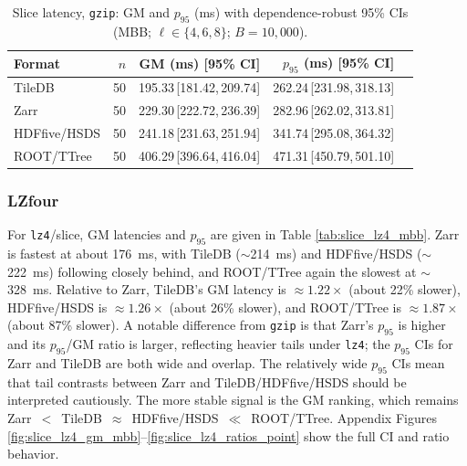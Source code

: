 \documentclass[nomenclature, english, bibtex]{kththesis}
\numberwithin{listing}{chapter}
\begin{document}
\begin{table}[H]
  \centering
  \caption{Slice latency, \texttt{gzip}: \gls{GM} and $p_{95}$ (ms) with dependence-robust 95\% CIs (\gls{MBB}; $\ell\in\{4,6,8\}$; $B{=}10{,}000$).}
  \label{tab:slice_gzip_mbb}
  \begin{tabular}{lrrrr}
    \toprule
    Format & $n$ & \gls{GM} (ms) [95\% \gls{CI}] & $p_{95}$ (ms) [95\% \gls{CI}] \\
    \midrule
    TileDB & 50 & 195.33\,[181.42,\,209.74] & 262.24\,[231.98,\,318.13] \\
    Zarr   & 50 & 229.30\,[222.72,\,236.39] & 282.96\,[262.02,\,313.81] \\
    \gls{HDFfive}/\gls{HSDS}   & 50 & 241.18\,[231.63,\,251.94] & 341.74\,[295.08,\,364.32] \\
    \gls{ROOT}/\gls{TTree}   & 50 & 406.29\,[396.64,\,416.04] & 471.31\,[450.79,\,501.10] \\
    \bottomrule
  \end{tabular}
\end{table}

\subsubsection{\texorpdfstring{\gls{LZfour}}{LZ4}}
For \texttt{lz4}/slice, \gls{GM} latencies and $p_{95}$ are given in Table \ref{tab:slice_lz4_mbb}. Zarr is fastest at about 176~ms, with TileDB ($\sim$214~ms) and \gls{HDFfive}/\gls{HSDS} ($\sim$222~ms) following closely behind, and \gls{ROOT}/\gls{TTree} again the slowest at $\sim$328~ms. Relative to Zarr, TileDB’s \gls{GM} latency is $\approx 1.22\times$ (about 22\% slower), \gls{HDFfive}/\gls{HSDS} is $\approx 1.26\times$ (about 26\% slower), and \gls{ROOT}/\gls{TTree} is $\approx 1.87\times$ (about 87\% slower). A notable difference from \texttt{gzip} is that Zarr’s $p_{95}$ is higher and its $p_{95}$/\gls{GM} ratio is larger, reflecting heavier tails under \texttt{lz4}; the $p_{95}$ CIs for Zarr and TileDB are both wide and overlap. The relatively wide $p_{95}$ CIs mean that tail contrasts between Zarr and TileDB/\gls{HDFfive}/\gls{HSDS} should be interpreted cautiously. The more stable signal is the \gls{GM} ranking, which remains Zarr~$<$~TileDB~$\approx$~\gls{HDFfive}/\gls{HSDS}~$\ll$~\gls{ROOT}/\gls{TTree}. Appendix Figures \ref{fig:slice_lz4_gm_mbb}–\ref{fig:slice_lz4_ratios_point} show the full \gls{CI} and ratio behavior.
\end{document}
